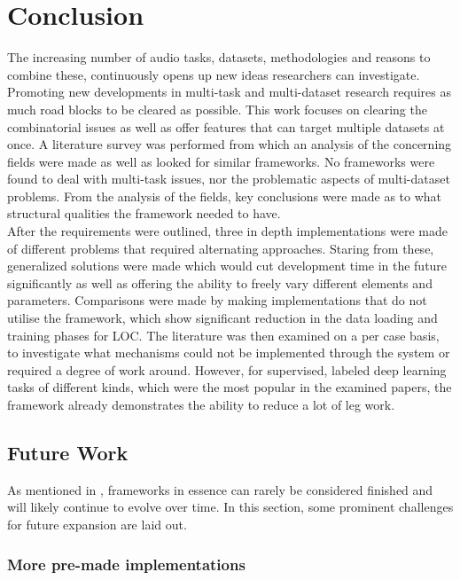 \chapter{Conclusion}

The increasing number of audio tasks, datasets, methodologies and reasons to combine these, continuously opens up new ideas researchers can investigate. Promoting new developments in multi-task and multi-dataset research requires as much road blocks to be cleared as possible. This work focuses on clearing the combinatorial issues as well as offer features that can target multiple datasets at once. A literature survey was performed from which an analysis of the concerning fields were made as well as looked for similar frameworks. No frameworks were found to deal with multi-task issues, nor the problematic aspects of multi-dataset problems. From the analysis of the fields, key conclusions were made as to what structural qualities the framework needed to have. \\

After the requirements were outlined, three in depth implementations were made of different problems that required alternating approaches. Staring from these, generalized solutions were made which would cut development time in the future significantly as well as offering the ability to freely vary different elements and parameters. Comparisons were made by making implementations that do not utilise the framework, which show significant reduction in the data loading and training phases for LOC. The literature was then examined on a per case basis, to investigate what mechanisms could not be implemented through the system or required a degree of work around. However, for supervised, labeled deep learning tasks of different kinds, which were the most popular in the examined papers, the framework already demonstrates the ability to reduce a lot of leg work.\\ 

\section{Future Work}

As mentioned in \cite{roberts1996evolving}, frameworks in essence can rarely be considered finished and will likely continue to evolve over time. In this section, some prominent challenges for future expansion are laid out.

\subsection{More pre-made implementations}

